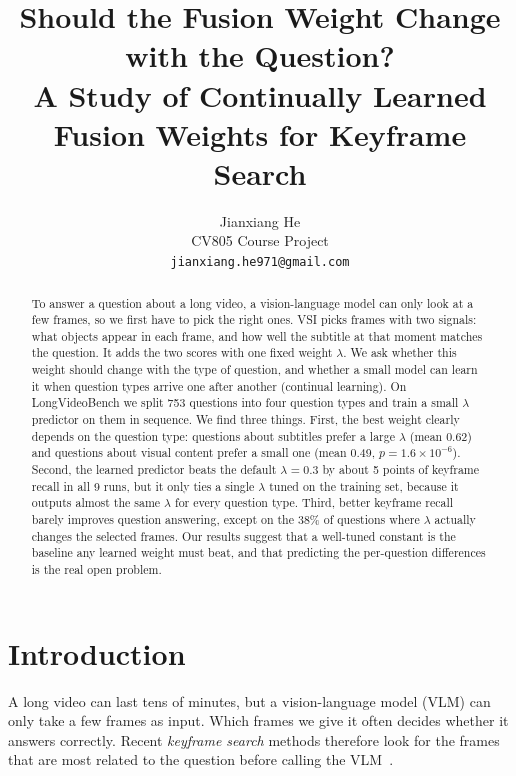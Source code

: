 \documentclass[10pt,twocolumn,letterpaper]{article}
\title{Should the Fusion Weight Change with the Question?\\
A Study of Continually Learned Fusion Weights for Keyframe Search}
\author{Jianxiang He\\
CV805 Course Project\\
{\tt\small jianxiang.he971@gmail.com}
}
\newcommand{\lam}{\lambda}
\begin{document}
\maketitle

\begin{abstract}
To answer a question about a long video, a vision-language model can only look at a few frames, so we first have to pick the right ones.
VSI picks frames with two signals: what objects appear in each frame, and how well the subtitle at that moment matches the question.
It adds the two scores with one fixed weight $\lam$.
We ask whether this weight should change with the type of question, and whether a small model can learn it when question types arrive one after another (continual learning).
On LongVideoBench we split 753 questions into four question types and train a small $\lam$ predictor on them in sequence.
We find three things.
First, the best weight clearly depends on the question type: questions about subtitles prefer a large $\lam$ (mean 0.62) and questions about visual content prefer a small one (mean 0.49, $p=1.6\times10^{-6}$).
Second, the learned predictor beats the default $\lam=0.3$ by about 5 points of keyframe recall in all 9 runs, but it only ties a single $\lam$ tuned on the training set, because it outputs almost the same $\lam$ for every question type.
Third, better keyframe recall barely improves question answering, except on the 38\% of questions where $\lam$ actually changes the selected frames.
Our results suggest that a well-tuned constant is the baseline any learned weight must beat, and that predicting the per-question differences is the real open problem.
\end{abstract}

\section{Introduction}
\label{sec:intro}

A long video can last tens of minutes, but a vision-language model (VLM) can only take a few frames as input.
Which frames we give it often decides whether it answers correctly.
Recent \emph{keyframe search} methods therefore look for the frames that are most related to the question before calling the VLM~\cite{ye2025tstar,tang2025aks,liu2025bolt}.
\end{document}

